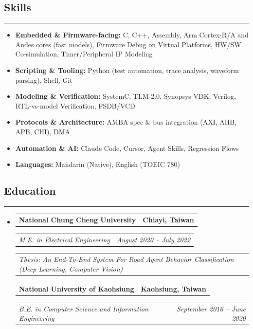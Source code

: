 \documentclass[11pt,a4paper]{article}
\makeatletter
\newcommand{\headerrow}[2]
{\begin{tabular*}{\linewidth}{l@{\extracolsep{\fill}}r}
#1 &
#2 \\
\end{tabular*}}
\makeatother
\begin{document}
\subsection*{\large Skills}
\hrule
\vspace{0.3em}

\begin{itemize}[leftmargin=1em,noitemsep]
	\item \textbf{Embedded \& Firmware-facing:}
	      C, C++, Assembly, Arm Cortex-R/A and Andes cores (fast models), Firmware Debug on Virtual Platforms, HW/SW Co-simulation, Timer/Peripheral IP Modeling
	\item \textbf{Scripting \& Tooling:}
	      Python (test automation, trace analysis, waveform parsing), Shell, Git
	\item \textbf{Modeling \& Verification:}
	      SystemC, TLM-2.0, Synopsys VDK, Verilog, RTL-vs-model Verification, FSDB/VCD
	\item \textbf{Protocols \& Architecture:}
	      AMBA spec \& bus integration (AXI, AHB, APB, CHI), DMA
    \item \textbf{Automation \& AI:}
          Claude Code, Cursor, Agent Skills, Regression Flows
    \item \textbf{Languages:}
          Mandarin (Native), English (TOEIC 780)
\end{itemize}

\subsection*{\large Education}
\hrule
\vspace{0.3em}

\begin{itemize}[leftmargin=1em]
	\parskip=0.1em

	\item
	      \headerrow
	      {\textbf{National Chung Cheng University}}
	      {\textbf{Chiayi, Taiwan}}
	      \headerrow
	      {\emph{M.E. in Electrical Engineering}}
	      {\emph{August 2020 -- July 2022}}
          \headerrow
          {\emph{Thesis: An End-To-End System For Road Agent Behavior Classification (Deep Learning, Computer Vision)}}
          {\emph{}}

	      \headerrow
          {\textbf{National University of Kaohsiung}}
	      {\textbf{Kaohsiung, Taiwan}}
          \headerrow
	      {\emph{B.E. in Computer Science and Information Engineering}}
	      {\emph{September 2016 -- June 2020}}
\end{itemize}
\end{document}
